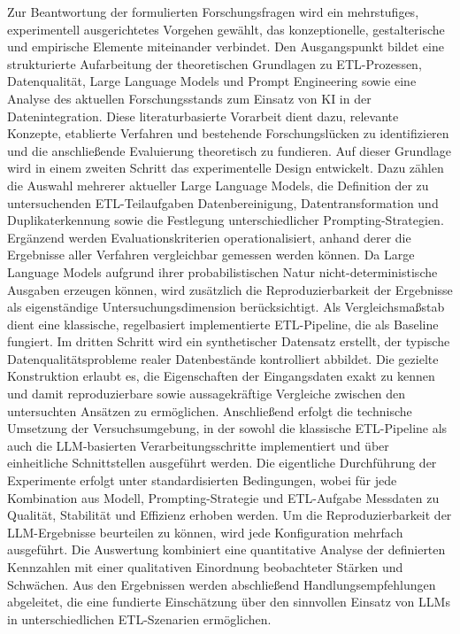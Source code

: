 Zur Beantwortung der formulierten Forschungsfragen wird ein mehrstufiges, experimentell ausgerichtetes Vorgehen gewählt, das konzeptionelle, gestalterische und empirische Elemente miteinander verbindet. Den Ausgangspunkt bildet eine strukturierte Aufarbeitung der theoretischen Grundlagen zu ETL-Prozessen, Datenqualität, Large Language Models und Prompt Engineering sowie eine Analyse des aktuellen Forschungsstands zum Einsatz von KI in der Datenintegration. Diese literaturbasierte Vorarbeit dient dazu, relevante Konzepte, etablierte Verfahren und bestehende Forschungslücken zu identifizieren und die anschließende Evaluierung theoretisch zu fundieren.
Auf dieser Grundlage wird in einem zweiten Schritt das experimentelle Design entwickelt. Dazu zählen die Auswahl mehrerer aktueller Large Language Models, die Definition der zu untersuchenden ETL-Teilaufgaben Datenbereinigung, Datentransformation und Duplikaterkennung sowie die Festlegung unterschiedlicher Prompting-Strategien. Ergänzend werden Evaluationskriterien operationalisiert, anhand derer die Ergebnisse aller Verfahren vergleichbar gemessen werden können. Da Large Language Models aufgrund ihrer probabilistischen Natur nicht-deterministische Ausgaben erzeugen können, wird zusätzlich die Reproduzierbarkeit der Ergebnisse als eigenständige Untersuchungsdimension berücksichtigt. Als Vergleichsmaßstab dient eine klassische, regelbasiert implementierte ETL-Pipeline, die als Baseline fungiert.
Im dritten Schritt wird ein synthetischer Datensatz erstellt, der typische Datenqualitätsprobleme realer Datenbestände kontrolliert abbildet. Die gezielte Konstruktion erlaubt es, die Eigenschaften der Eingangsdaten exakt zu kennen und damit reproduzierbare sowie aussagekräftige Vergleiche zwischen den untersuchten Ansätzen zu ermöglichen. Anschließend erfolgt die technische Umsetzung der Versuchsumgebung, in der sowohl die klassische ETL-Pipeline als auch die LLM-basierten Verarbeitungsschritte implementiert und über einheitliche Schnittstellen ausgeführt werden.
Die eigentliche Durchführung der Experimente erfolgt unter standardisierten Bedingungen, wobei für jede Kombination aus Modell, Prompting-Strategie und ETL-Aufgabe Messdaten zu Qualität, Stabilität und Effizienz erhoben werden. Um die Reproduzierbarkeit der LLM-Ergebnisse beurteilen zu können, wird jede Konfiguration mehrfach ausgeführt. Die Auswertung kombiniert eine quantitative Analyse der definierten Kennzahlen mit einer qualitativen Einordnung beobachteter Stärken und Schwächen. Aus den Ergebnissen werden abschließend Handlungsempfehlungen abgeleitet, die eine fundierte Einschätzung über den sinnvollen Einsatz von LLMs in unterschiedlichen ETL-Szenarien ermöglichen.

